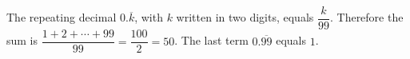The repeating decimal $0.\overline{k}$, with $k$ written in two digits, equals $\dfrac{k}{99}$. Therefore the sum is $\dfrac{1+2+\cdots+99}{99}=\dfrac{100}{2}=\boxed{50}$. The last term $0.\overline{99}$ equals $1$.
